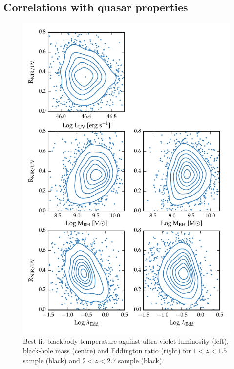 \subsection{Correlations with quasar properties}

\begin{figure}
  \centering
  \includegraphics[width=\textwidth]{figures/chapter05/correlations_contour.pdf}
  \caption[{Best-fit blackbody temperature against ultra-violet luminosity, black-hole mass and Eddington ratio.}]{Best-fit blackbody temperature against ultra-violet luminosity (left), black-hole mass (centre) and Eddington ratio (right) for $1 < z < 1.5$ sample (black) and $2 < z < 2.7$ sample (black).}
  \label{fig:correlations_contour}
\end{figure}


